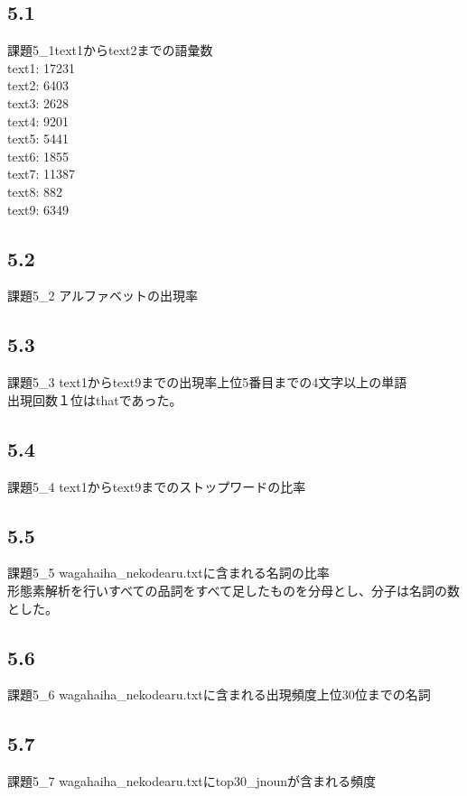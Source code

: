 \documentclass[a4j]{jarticle}
\begin{document}
\subsection*{5.1}
  課題5\_1text1からtext2までの語彙数\\
  text1: 17231\\
  text2: 6403\\
  text3: 2628\\
  text4: 9201\\
  text5: 5441\\
  text6: 1855\\
  text7: 11387\\
  text8: 882\\
  text9: 6349
\subsection*{5.2}
  課題5\_2 アルファベットの出現率\\
  \fontsize{5.5pt}{0pt}
\subsection*{5.3}
  課題5\_3 text1からtext9までの出現率上位5番目までの4文字以上の単語\\
  \fontsize{10pt}{5pt}
  出現回数１位はthatであった。
\subsection*{5.4}
  課題5\_4 text1からtext9までのストップワードの比率\\
  \fontsize{10pt}{10pt}
\subsection*{5.5}
  課題5\_5 wagahaiha\_nekodearu.txtに含まれる名詞の比率\\
  形態素解析を行いすべての品詞をすべて足したものを分母とし、分子は名詞の数とした。\\
  \fontsize{10pt}{10pt}
\subsection*{5.6}
  課題5\_6 wagahaiha\_nekodearu.txtに含まれる出現頻度上位30位までの名詞\\
  \fontsize{10pt}{10pt}
\subsection*{5.7}
  課題5\_7 wagahaiha\_nekodearu.txtにtop30\_jnounが含まれる頻度\\
  \fontsize{10pt}{10pt}
\end{document}
